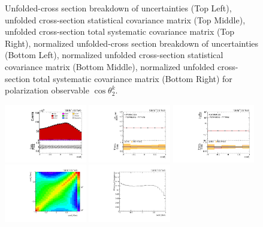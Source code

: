 \begin{figure}[htb]
\begin{center}
\caption{Unfolded-cross section breakdown of uncertainties (Top Left), unfolded cross-section statistical covariance matrix (Top Middle), unfolded cross-section total systematic covariance matrix (Top Right), normalized unfolded-cross section breakdown of uncertainties (Bottom Left), normalized unfolded cross-section statistical covariance matrix (Bottom Middle), normalized unfolded cross-section total systematic covariance matrix (Bottom Right) for polarization observable $\cos\theta_{2}^{k}$.}
\label{fig:b2k_uncertainties}
\end{center}
\end{figure}
\clearpage
\begin{figure}[htb]
\begin{center}
 \includegraphics[width=0.32\textwidth]{fig_fullRun2UL/controlplots/combined/Hyp_AntiLeptonBr.pdf}
 \includegraphics[width=0.32\textwidth]{fig_fullRun2UL/unfolding/combined/UnfoldedResults_b1r.pdf}
 \includegraphics[width=0.32\textwidth]{fig_fullRun2UL/unfolding/combined/UnfoldedResultsNorm_b1r.pdf} \\
 \includegraphics[width=0.32\textwidth]{fig_fullRun2UL/unfolding/combined/ResponseMatrix_b1r.pdf}
 \includegraphics[width=0.32\textwidth]{fig_fullRun2UL/unfolding/combined/TotEff_b1r.pdf}

\end{center}
\end{figure}
